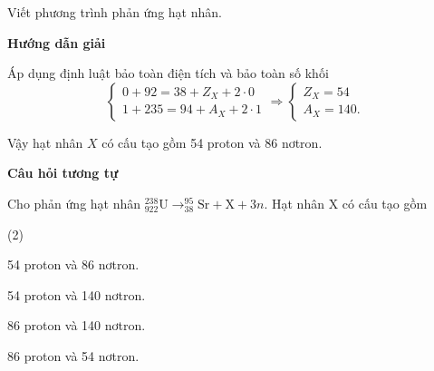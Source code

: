 \begin{dang}{Viết phương trình phản ứng hạt nhân.}

{\begin{center}
	\textbf{Hướng dẫn giải}
\end{center}
	Áp dụng định luật bảo toàn điện tích và bảo toàn số khối
	\begin{equation*}
	\left\{
	\begin{matrix}
	0+92=38+Z_X+2\cdot0\\
	1+235=94+A_X+2\cdot1
	\end{matrix}
	\right.
	\Rightarrow
	\left\{
	\begin{matrix}
	Z_X=54\\
	A_X=140.
	\end{matrix}
	\right.
	\end{equation*}
	
	Vậy hạt nhân $X$ có cấu tạo gồm 54 proton và 86 nơtron.
	
\begin{center}
	\textbf{Câu hỏi tương tự}
\end{center}

Cho phản ứng hạt nhân $ ^{238}_{922} \text{U} \longrightarrow ^{95}_{38} \text{Sr} + \text{X} + 3n $. Hạt nhân X có cấu tạo gồm
\begin{mcq}(2)
	\item 54 proton và 86 nơtron.
	\item 54 proton và 140 nơtron.
	\item 86 proton và 140 nơtron.
	\item 86 proton và 54 nơtron.
\end{mcq}

}
\end{dang}
